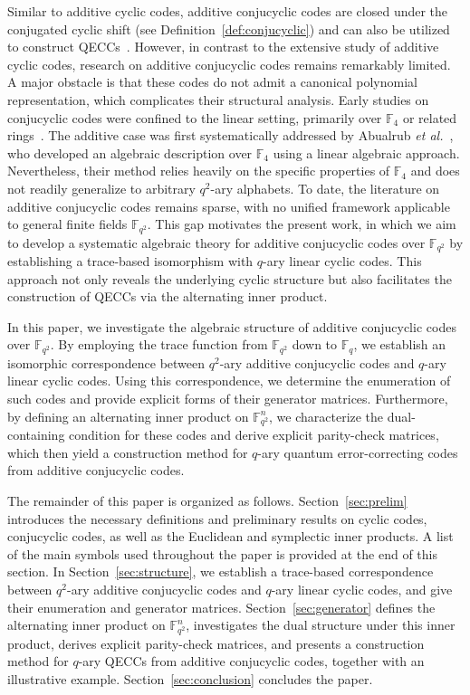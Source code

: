 \documentclass{aims}
\numberwithin{equation}{section}
\theoremstyle{definition}
\newcommand{\F}{\mathbb{F}}
\begin{document}
Similar to additive cyclic codes, additive conjucyclic codes are closed under the conjugated cyclic shift (see Definition~\ref{def:conjucyclic}) and can also be utilized to construct QECCs~\cite{calderbank1998}. However, in contrast to the extensive study of additive cyclic codes, research on additive conjucyclic codes remains remarkably limited. A major obstacle is that these codes do not admit a canonical polynomial representation, which complicates their structural analysis. Early studies on conjucyclic codes were confined to the linear setting, primarily over $\F_4$ \cite{abualrub2007} or related rings~\cite{sirap2008}. The additive case was first systematically addressed by Abualrub \textit{et al.}~\cite{abualrub2020, abualrub2022}, who developed an algebraic description over $\F_4$ using a linear algebraic approach. Nevertheless, their method relies heavily on the specific properties of $\F_4$ and does not readily generalize to arbitrary $q^2$-ary alphabets. To date, the literature on additive conjucyclic codes remains sparse, with no unified framework applicable to general finite fields $\F_{q^2}$. This gap motivates the present work, in which we aim to develop a systematic algebraic theory for additive conjucyclic codes over $\F_{q^2}$ by establishing a trace-based isomorphism with $q$-ary linear cyclic codes. This approach not only reveals the underlying cyclic structure but also facilitates the construction of QECCs via the alternating inner product.



In this paper, we investigate the algebraic structure of additive conjucyclic codes over $\F_{q^2}$. By employing the trace function from $\F_{q^2}$ down to $\F_q$, we establish an isomorphic correspondence between $q^2$-ary additive conjucyclic codes and $q$-ary linear cyclic codes. Using this correspondence, we determine the enumeration of such codes and provide explicit forms of their generator matrices. Furthermore, by defining an alternating inner product on $\F_{q^2}^n$, we characterize the dual-containing condition for these codes and derive explicit parity-check matrices, which then yield a construction method for $q$-ary quantum error-correcting codes from additive conjucyclic codes.

The remainder of this paper is organized as follows. Section~\ref{sec:prelim} introduces the necessary definitions and preliminary results on cyclic codes, conjucyclic codes, as well as the Euclidean and symplectic inner products. A list of the main symbols used throughout the paper is provided at the end of this section. In Section~\ref{sec:structure}, we establish a trace-based correspondence between $q^2$-ary additive conjucyclic codes and $q$-ary linear cyclic codes, and give their enumeration and generator matrices. Section~\ref{sec:generator} defines the alternating inner product on $\F_{q^2}^n$, investigates the dual structure under this inner product, derives explicit parity-check matrices, and presents a construction method for $q$-ary QECCs from additive conjucyclic codes, together with an illustrative example. Section~\ref{sec:conclusion} concludes the paper.
\end{document}

